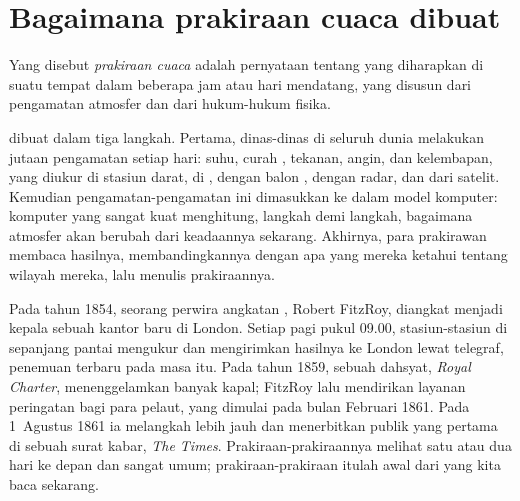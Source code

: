 \section{Bagaimana prakiraan cuaca dibuat}

\begin{definition}\label{def:g8:fronts-and-weather-maps:forecast}
Yang disebut \emph{prakiraan cuaca} adalah
pernyataan tentang  yang diharapkan di suatu tempat dalam beberapa
jam atau hari mendatang, yang disusun dari pengamatan atmosfer dan dari
hukum-hukum fisika.
\end{definition}

 dibuat dalam tiga langkah. Pertama, dinas-dinas  di
seluruh dunia melakukan jutaan pengamatan setiap hari: suhu, curah ,
tekanan, angin, dan kelembapan, yang diukur di stasiun darat, di ,
dengan balon , dengan radar, dan dari satelit. Kemudian
pengamatan-pengamatan ini dimasukkan ke dalam model komputer: komputer
yang sangat kuat menghitung, langkah demi langkah, bagaimana atmosfer akan
berubah dari keadaannya sekarang. Akhirnya, para prakirawan membaca
hasilnya, membandingkannya dengan apa yang mereka ketahui tentang wilayah
mereka, lalu menulis prakiraannya.

\begin{history}
Pada tahun 1854, seorang perwira angkatan , Robert FitzRoy, diangkat
menjadi kepala sebuah kantor  baru di London. Setiap pagi pukul
09.00, stasiun-stasiun di sepanjang pantai mengukur  dan mengirimkan
hasilnya ke London lewat telegraf, penemuan terbaru pada masa itu. Pada
tahun 1859, sebuah  dahsyat,  \emph{Royal Charter},
menenggelamkan banyak kapal; FitzRoy lalu mendirikan layanan peringatan
 bagi para pelaut, yang dimulai pada bulan Februari 1861. Pada
1~Agustus 1861 ia melangkah lebih jauh dan menerbitkan 
publik yang pertama di sebuah surat kabar, \emph{The Times}.
Prakiraan-prakiraannya melihat satu atau dua hari ke depan dan sangat
umum; prakiraan-prakiraan itulah awal dari  yang kita baca
sekarang.
\end{history}

